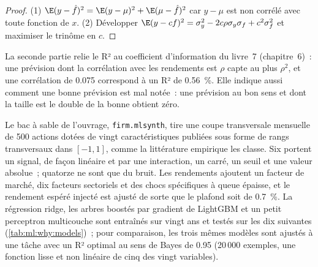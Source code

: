 \begin{proof}
(1) $\E(y - \hat f)^2 = \E(y - \mu)^2 + \E(\mu - \hat f)^2$ car $y - \mu$ est non corrélé avec toute fonction de $x$.
(2) Développer $\E(y - cf)^2 = \sigma_y^2 - 2c\rho\sigma_y\sigma_f + c^2\sigma_f^2$ et maximiser le trinôme en $c$.
\end{proof}

La seconde partie relie le R² au coefficient d'information du livre~7 (chapitre~6)~: une prévision dont la corrélation
avec les rendements est $\rho$ capte au plus $\rho^2$, et une corrélation de 0.075 correspond à un R² de 0.56~\%. Elle indique aussi comment une
bonne prévision est mal notée~: une prévision au bon sens et dont la taille est le double de la bonne obtient zéro.

Le bac à sable de l'ouvrage, \texttt{firm.mlsynth}, tire une coupe transversale mensuelle de 500 actions dotées de vingt caractéristiques
publiées sous forme de rangs transversaux dans $[-1, 1]$, comme la littérature empirique les classe. Six portent un signal, de façon linéaire et
par une interaction, un carré, un seuil et une valeur absolue~; quatorze ne sont que du bruit. Les rendements ajoutent un facteur de marché,
dix facteurs sectoriels et des chocs spécifiques à queue épaisse, et le rendement espéré injecté est ajusté de sorte que le plafond
soit de 0.7~\%. La régression ridge, les arbres boostés par gradient de LightGBM et un petit perceptron multicouche sont entraînés sur vingt
ans et testés sur les dix suivantes (\cref{tab:ml:why:models})~; pour comparaison, les trois mêmes modèles sont ajustés à une tâche
avec un R² optimal au sens de Bayes de 0.95 (20\,000 exemples, une fonction lisse et non linéaire de cinq des vingt variables).

